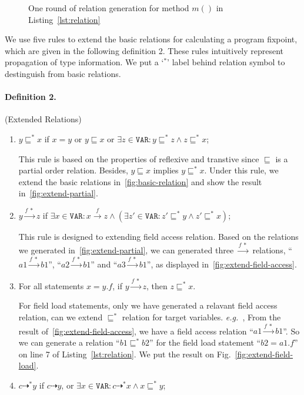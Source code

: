 \documentclass{fac}
\newcommand\eg{\textit{e.g.\ }}
\newcommand\Var{\mathtt{VAR}}
\newcommand{\less}{\sqsubseteq}
\newcommand{\tflow}{\dashrightarrow}
\newcommand{\hflow}{\longrightarrow}
\newcommand{\lhflow}[1]{\stackrel{#1}{\hflow}}
\begin{document}
\begin{figure}
\caption{One round of relation generation for method $m()$ in Listing~\ref{lst:relation}}
\label{fig:relations}
\end{figure}

We use five rules to extend the basic relations for  calculating a program fixpoint, which are given in the following definition 2. These rules intuitively represent propagation of type information. We put a `$^*$' label behind relation symbol to destinguish from basic relations.
\paragraph{Definition 2.}\label{def:extension} (Extended Relations)
\begin{enumerate}
  \item $y\less^* x$ if $x=y$ or $y\less x$ or $\exists z\in\Var:y\less^* z\wedge z\less^* x$;
  
  This rule is based on the properties of reflexive and transtive since $\less$ is a partial order relation. Besides, $y\less x$ implies $y\less^* x$. Under this rule, we extend the basic relations in~\ref{fig:basic-relation} and show the result in~\ref{fig:extend-partial}.
  
  \item $y\lhflow{f\ *}z$ if $\exists x\in\Var: x\lhflow{f}z\wedge (\exists z'\in\Var: z'\less^* y \wedge z'\less^*x)$;
  
  This rule is designed to extending field access relation. Based on the relations we generated in~\ref{fig:extend-partial}, we can generated three $\lhflow{f\ *}$ relations, ``$a1 \lhflow{f\ *} b1$'', ``$a2 \lhflow{f\ *} b1$'' and ``$a3 \lhflow{f\ *} b1$'', as displayed in~\ref{fig:extend-field-access}.
  
  \item For all statements $x = y.f $, if $y\lhflow{f\ *}z$, then $z\less^* x$.

  For field load statements, only we have generated a relavant field access relation, can we extend $\less^*$ relation for target variables. \eg, From the result of~\ref{fig:extend-field-access}, we have a field access relation ``$a1\lhflow{f\ *} b1$''. So we can generate a relation ``$b1\less^* b2$'' for the field load statement ``$b2=a1.f$'' on line 7 of Listing~\ref{lst:relation}. We put the result on Fig.~\ref{fig:extend-field-load}.
  
  \item $c\tflow^* y$ if $c\tflow y$, or $\exists x\in\Var:c\tflow^* x\wedge x\less^* y$;
  

\end{enumerate}
\end{document}
